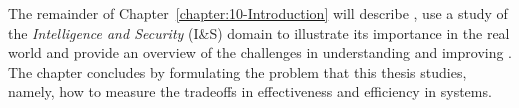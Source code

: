 The remainder of Chapter~\ref{chapter:10-Introduction} will describe \gai,  use a study of the \textit{Intelligence and Security} (I\&S) domain to illustrate its importance in the real world and provide an overview of the challenges in understanding and improving \gai.
The chapter concludes by formulating the problem  that this thesis studies, namely, how to measure the tradeoffs in effectiveness and efficiency in \gai systems.  

%


% 
% 
% 
 